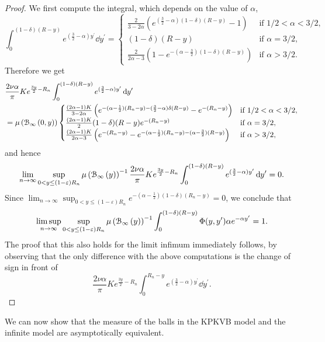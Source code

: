 \begin{proof}
We first compute the integral, which depends on the value of $\alpha$,
\[
	\int_0^{(1-\delta)(R-y)} e^{(\frac{3}{2} - \alpha)y^\prime} \dd y^\prime
	= \begin{cases}
		\frac{2}{3 - 2\alpha}\left(e^{(\frac{3}{2} - \alpha)(1-\delta)(R-y)} - 1\right) &\mbox{if } 1/2 < \alpha < 3/2,\\
		(1-\delta)(R-y) &\mbox{if } \alpha = 3/2,\\
		\frac{2}{2\alpha-3}\left(1 - e^{-(\alpha - \frac{3}{2})(1-\delta)(R-y)}\right) &\mbox{if } \alpha > 3/2.
	\end{cases}
\]
Therefore we get
\begin{align*}
	&\frac{2\nu \alpha}{\pi} K e^{\frac{3 y}{2} - R_n}
		\int_0^{(1-\delta)(R-y)} e^{(\frac{3}{2} - \alpha)y^\prime} \operatorname{\mathrm{d}\hspace{-2pt}} y^\prime\\
	&= \mu\left({\mathcal B}_{\infty}\left(0,y\right)\right)\begin{cases}
		\frac{(2\alpha - 1)K}{3 - 2\alpha}\left(e^{-(\alpha - \frac{1}{2})(R_n - y)-(\frac{3}{2}-\alpha)\delta(R-y)} 
			- e^{-(R_n - y)}\right)
		&\mbox{if } 1/2 < \alpha < 3/2,\\
		\frac{(2\alpha -1)K}{2} (1-\delta)(R - y)e^{-(R_n - y)} &\mbox{if } \alpha = 3/2,\\
		\frac{(2\alpha - 1)K}{2\alpha - 3} \left(e^{-(R_n - y)} - e^{-(\alpha - \frac{1}{2})(R_n - y) 
			-(\alpha - \frac{3}{2})(R-y)}\right)
		&\mbox{if } \alpha > 3/2,
	\end{cases}
\end{align*}
and hence
\[
	\lim_{n \to \infty} \sup_{0 < y \le (1-\varepsilon)R_n} \mu\left({\mathcal B}_{\infty}\left(y\right)\right)^{-1}
	\frac{2\nu \alpha}{\pi} K e^{\frac{3 y}{2} - R_n}
			\int_0^{(1-\delta)(R-y)} e^{(\frac{3}{2} - \alpha)y^\prime} \operatorname{\mathrm{d}\hspace{-2pt}} y^\prime = 0.
\]
Since $\lim_{n \to \infty} \sup_{0 < y \le (1-\varepsilon)R_n} e^{-(\alpha - \frac{1}{2})(1-\delta)(R_n - y)} = 0$, we conclude that
\[
	\limsup_{n \to \infty} \sup_{0 < y \le (1-\varepsilon)R_n} \mu\left({\mathcal B}_{\infty}\left(y\right)\right)^{-1} \int_0^{(1-\delta)(R-y)} \Phi(y,y^\prime)
		\alpha e^{-\alpha y^\prime} = 1.
\]
The proof that this also holds for the limit infimum immediately follows, by observing that the only difference with the above computations is the change of sign in front of 
\[
	\frac{2 \nu \alpha}{\pi} K e^{\frac{3 y}{2} - R_n}\int_0^{R_n-y} e^{(\frac{3}{2} - \alpha)y^\prime} \dd y^\prime.
\]
\end{proof}

We can now show that the measure of the balls in the KPKVB model and the infinite model are asymptotically equivalent.

